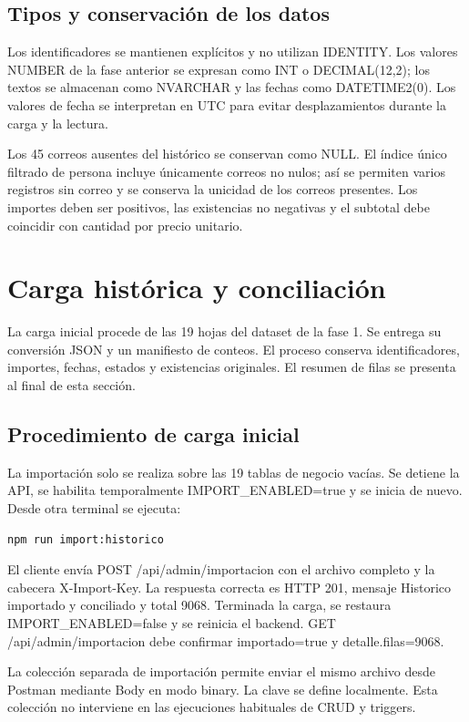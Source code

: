 \documentclass[10pt,letterpaper]{article}
\begin{document}
\subsection{Tipos y conservación de los datos}
Los identificadores se mantienen explícitos y no utilizan IDENTITY. Los valores NUMBER de la fase anterior se expresan como INT o DECIMAL(12,2); los textos se almacenan como NVARCHAR y las fechas como DATETIME2(0). Los valores de fecha se interpretan en UTC para evitar desplazamientos durante la carga y la lectura.

Los 45 correos ausentes del histórico se conservan como NULL. El índice único filtrado de persona incluye únicamente correos no nulos; así se permiten varios registros sin correo y se conserva la unicidad de los correos presentes. Los importes deben ser positivos, las existencias no negativas y el subtotal debe coincidir con cantidad por precio unitario.

\section{Carga histórica y conciliación}
La carga inicial procede de las 19 hojas del dataset de la fase 1. Se entrega su conversión JSON y un manifiesto de conteos. El proceso conserva identificadores, importes, fechas, estados y existencias originales. El resumen de filas se presenta al final de esta sección.

\subsection{Procedimiento de carga inicial}
La importación solo se realiza sobre las 19 tablas de negocio vacías. Se detiene la API, se habilita temporalmente IMPORT\_ENABLED=true y se inicia de nuevo. Desde otra terminal se ejecuta:
\begin{lstlisting}
npm run import:historico
\end{lstlisting}
El cliente envía POST /api/admin/importacion con el archivo completo y la cabecera X-Import-Key. La respuesta correcta es HTTP 201, mensaje Historico importado y conciliado y total 9068. Terminada la carga, se restaura IMPORT\_ENABLED=false y se reinicia el backend. GET /api/admin/importacion debe confirmar importado=true y detalle.filas=9068.

La colección separada de importación permite enviar el mismo archivo desde Postman mediante Body en modo binary. La clave se define localmente. Esta colección no interviene en las ejecuciones habituales de CRUD y triggers.
\end{document}
